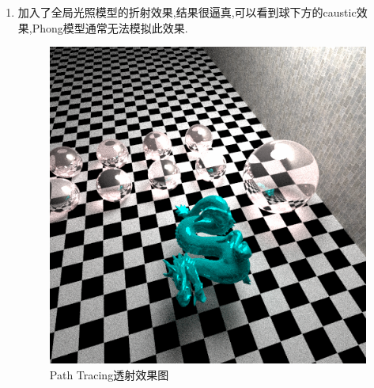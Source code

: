 \begin{enumerate}
  \item 加入了全局光照模型的折射效果,结果很逼真,可以看到球下方的caustic效果,Phong模型通常无法模拟此效果.
    \begin{figure}[H]
      \centering
      \includegraphics[scale=0.6]{img/caustic.png}
      \caption{Path Tracing透射效果图\label{fig:pt_transm}}
    \end{figure}


\end{enumerate}
